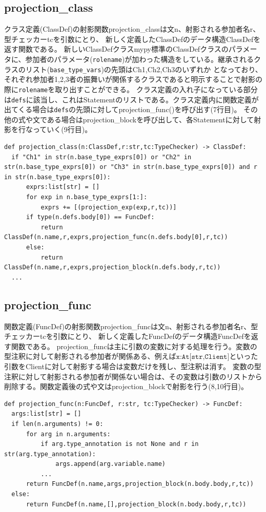 \documentclass{thesis}
\begin{document}
\subsection{projection\_class}
クラス定義(ClassDef)の射影関数projection\_classは文\textsf{n}、射影される参加者名\textsf{r}、型チェッカー\textsf{tc}を引数にとり、 新しく定義したClassDefのデータ構造\textsf{ClassDef}を返す関数である。
新しいClassDefクラスmypy標準のClassDefクラスのパラメータに、参加者のパラメータ(\texttt{rolename})が加わった構造をしている。継承されるクラスのリスト(\texttt{base\_type\_vars})の先頭はCh1,Ch2,Ch3のいずれか
となっており、それぞれ参加者1,2,3者の振舞いが関係するクラスであると明示することで射影の際に\texttt{rolename}を取り出すことができる。
クラス定義の入れ子になっている部分は\texttt{defs}に該当し、これはStatementのリストである。クラス定義内に関数定義が出てくる場合は\texttt{defs}の先頭に対してprojection\_func()を呼び出す(7行目)。
その他の式や文である場合はprojection\_blockを呼び出して、各Statementに対して射影を行なっていく(9行目)。
\begin{lstlisting}[caption=pro\_class.py]
def projection_class(n:ClassDef,r:str,tc:TypeChecker) -> ClassDef:
  if "Ch1" in str(n.base_type_exprs[0]) or "Ch2" in str(n.base_type_exprs[0]) or "Ch3" in str(n.base_type_exprs[0]) and r in str(n.base_type_exprs[0]):
      exprs:list[str] = []
      for exp in n.base_type_exprs[1:]:
          exprs += [(projection_exp(exp,r,tc))]
      if type(n.defs.body[0]) == FuncDef: 
          return ClassDef(n.name,r,exprs,projection_func(n.defs.body[0],r,tc))
      else: 
          return ClassDef(n.name,r,exprs,projection_block(n.defs.body,r,tc))
  ... 
\end{lstlisting}
\subsection{projection\_func}
関数定義(FuncDef)の射影関数projection\_funcは文\textsf{n}、射影される参加者名\textsf{r}、型チェッカー\textsf{tc}を引数にとり、 新しく定義したFuncDefのデータ構造\textsf{FuncDef}を返す関数である。
projection\_funcは主に引数の変数に対する処理を行う。変数の型注釈に対して射影される参加者が関係ある、例えば$\texttt{x:At[str,Client]}$といった引数をClientに対して射影する場合は変数だけを残し、型注釈は消す。
変数の型注釈に対して射影される参加者が関係ない場合は、その変数は引数のリストから削除する。関数定義後の式や文はprojection\_blockで射影を行う(8,10行目)。
\begin{lstlisting}[caption=pro\_func.py]
def projection_func(n:FuncDef, r:str, tc:TypeChecker) -> FuncDef:
  args:list[str] = []
  if len(n.arguments) != 0:
      for arg in n.arguments:
          if arg.type_annotation is not None and r in str(arg.type_annotation):
              args.append(arg.variable.name)
          ... 
      return FuncDef(n.name,args,projection_block(n.body.body,r,tc))
  else:
      return FuncDef(n.name,[],projection_block(n.body.body,r,tc))
\end{lstlisting}
\end{document}
